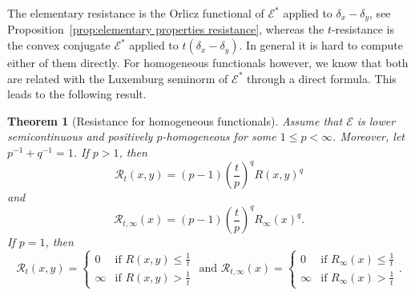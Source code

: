 \documentclass[a4paper,11pt,reqno]{amsart}
\newtheorem{theorem}[lemma]{Theorem}
\theoremstyle{definition}
\numberwithin{equation}{section}
\newcommand{\cR}{{\mathcal R}}
\newcommand{\cE}{{\mathcal E}}
\newcommand{\1}{\mathds{1}}
\begin{document}
 
 
  The elementary resistance is the Orlicz functional of $\cE^*$ applied to $\delta_x - \delta_y$, see Proposition~\ref{prop:elementary properties resistance}, whereas the $t$-resistance is the convex conjugate  $\cE^*$ applied to $t(\delta_x - \delta_y)$. In general it is hard to compute either of them directly.  For homogeneous functionals however, we know that both are related with the Luxemburg seminorm of $\cE^*$ through a direct formula. This leads to the following result.
 
%  

\begin{theorem}[Resistance for homogeneous functionals] \label{theorem:homogeneous resistance}
 Assume that $\cE$ is lower semicontinuous and positively $p$-homogeneous for some $1 \leq p < \infty$. Moreover, let $p^{-1} + q^{-1}  = 1$. If $p > 1$, then 
 $$\cR_t(x,y) = (p-1) \left(\frac t p\right)^q R(x,y)^q  $$
 and 
 $$\cR_{t,\infty}(x) = (p-1) \left(\frac t p\right)^q R_\infty(x)^q.$$
 If $p = 1$, then 
 $$\cR_t(x,y) = \begin{cases}
                 0 &\text{if } R(x,y) \leq \frac{1}{t}\\
                 \infty &\text{if } R(x,y) > \frac{1}{t}
                \end{cases} \text{ and } \cR_{t,\infty}(x) = \begin{cases}
                 0 &\text{if } R_\infty(x) \leq \frac{1}{t}\\
                 \infty &\text{if } R_\infty(x) > \frac{1}{t}
                \end{cases}.$$

\end{theorem}
\end{document}
